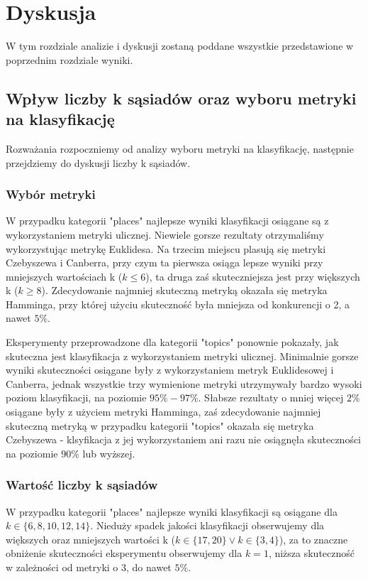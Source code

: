\documentclass{classrep}
\begin{document}
\section{Dyskusja}
W tym rozdziale analizie i dyskusji zostaną poddane wszystkie przedstawione w poprzednim rozdziale wyniki.

\subsection{Wpływ liczby k sąsiadów oraz wyboru metryki na klasyfikację}
Rozważania rozpoczniemy od analizy wyboru metryki na klasyfikację, następnie przejdziemy do dyskusji liczby k sąsiadów.

\subsubsection{Wybór metryki}
W przypadku kategorii "places" najlepsze wyniki klasyfikacji osiągane są z wykorzystaniem metryki ulicznej. Niewiele gorsze rezultaty otrzymaliśmy wykorzystując metrykę Euklidesa. Na trzecim miejscu plasują się metryki Czebyszewa i Canberra, przy czym ta pierwsza osiąga lepsze wyniki przy mniejszych wartościach k ($k\leq6$), ta druga zaś skuteczniejsza jest przy większych k ($k\geq8$). Zdecydowanie najmniej skuteczną metryką okazała się metryka Hamminga, przy której użyciu skuteczność była mniejsza od konkurencji o 2, a nawet $5\%$. \newline

Eksperymenty przeprowadzone dla kategorii "topics" ponownie pokazały, jak skuteczna jest klasyfikacja z wykorzystaniem metryki ulicznej. Minimalnie gorsze wyniki skuteczności osiągane były z wykorzystaniem metryk Euklidesowej i Canberra, jednak wszystkie trzy wymienione metryki utrzymywały bardzo wysoki poziom klasyfikacji, na poziomie $95\%-97\%$. Słabsze rezultaty o mniej więcej $2\%$ osiągane były z użyciem metryki Hamminga, zaś zdecydowanie najmniej skuteczną metryką w przypadku kategorii "topics" okazała się metryka Czebyszewa - klsyfikacja z jej wykorzystaniem ani razu nie osiągnęła skuteczności na poziomie $90\%$ lub wyższej. \newline

\subsubsection{Wartość liczby k sąsiadów}
W przypadku kategorii "places" najlepsze wyniki klasyfikacji są osiągane dla $k \in \{6, 8, 10, 12, 14\}$. Nieduży spadek jakości klasyfikacji obserwujemy dla większych oraz mniejszych wartości k ($k\in \{17, 20\} \lor k \in \{3, 4\}$), za to znaczne obniżenie skuteczności eksperymentu obserwujemy dla $k=1$, niższa skuteczność w zależności od metryki o 3, do nawet $5\%$. \newline
\end{document}
